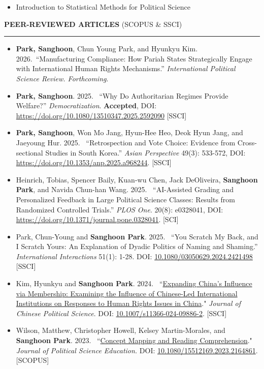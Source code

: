 \documentclass[
  16,
]{article}
\providecommand{\tightlist}{%
  \setlength{\itemsep}{0pt}\setlength{\parskip}{0pt}}
\begin{document}
\begin{itemize}
\tightlist
\item
  Introduction to Statistical Methods for Political Science
\end{itemize}

\vspace{7pt}

\begin{large}{\bf PEER-REVIEWED ARTICLES} (SCOPUS \& SSCI)
  \vspace{3pt}
  \hrule
\end{large}
  \begin{itemize}
    \item[7.] \textbf{Park, Sanghoon}, Chun Young Park, and Hyunkyu Kim. 2026.~``Manufacturing Compliance: How Pariah States Strategically Engage with International Human Rights Mechanisms.'' \textit{International Political Science Review. Forthcoming}.
    \item[6.] \textbf{Park, Sanghoon}. 2025. ~``Why Do Authoritarian Regimes Provide Welfare?'' \textit{Democratization}. \textbf{Accepted}, DOI: \href{https://doi.org/10.1080/13510347.2025.2592090}{https://doi.org/10.1080/13510347.2025.2592090} [SSCI]
    \item[5.] \textbf{Park, Sanghoon}, Won Mo Jang, Hyun-Hee Heo, Deok Hyun Jang, and Jaeyoung Hur. 2025. ~``Retrospection and Vote Choice: Evidence from Cross-sectional Studies in South Korea.'' \textit{Asian Perspective} 49(3): 533-572, DOI:  \href{https://doi.org/10.1353/anp.2025.a968244}{https://doi.org/10.1353/anp.2025.a968244}. [SSCI]
    \item[4.] Heinrich, Tobias, Spencer Baily, Kuan-wu Chen, Jack DeOliveira, \textbf{Sanghoon Park}, and Navida Chun-han Wang. 2025. ~``AI-Assisted Grading and Personalized Feedback in Large Political Science Classes: Results from Randomized Controlled Trials.'' \textit{PLOS One}. 20(8): e0328041, DOI:  \href{https://doi.org/10.1371/journal.pone.0328041}{https://doi.org/10.1371/journal.pone.0328041}. [SCI]
    \item[3.] Park, Chun-Young and \textbf{Sanghoon Park}. 2025. ~``You Scratch My Back, and I Scratch Yours: An Explanation of Dyadic Politics of Naming and Shaming.'' \textit{International Interactions} 51(1): 1-28. DOI: \href{https://doi.org/10.1080/03050629.2024.2421498}{10.1080/03050629.2024.2421498} [SSCI]
    \item[2.] Kim, Hyunkyu and \textbf{Sanghoon Park}. 2024. ~``\href{https://doi.org/10.1007/s11366-024-09886-2}{Expanding China’s Influence via Membership: Examining the Influence of Chinese-Led International Institutions on Responses to Human Rights Issues in China}." \textit{Journal of Chinese Political Science}. DOI: \href{https://doi.org/10.1007/s11366-024-09886-2}{10.1007/s11366-024-09886-2}. [SSCI]
    \item[1.] Wilson, Matthew, Christopher Howell, Kelsey Martin-Morales, and \textbf{Sanghoon Park}. 2023. ~``\href{https://www.tandfonline.com/doi/full/10.1080/15512169.2023.2164861}{Concept Mapping and Reading Comprehension}." \textit{Journal of Political Science Education.} DOI: \href{https://doi.org/10.1080/15512169.2023.2164861}{10.1080/15512169.2023.2164861}. [SCOPUS]
\end{itemize}
\end{document}
